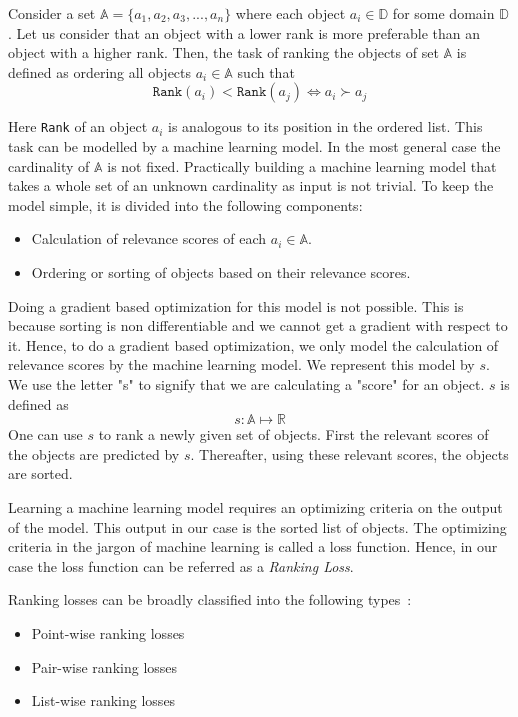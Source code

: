 \documentclass[12pt, twoside, ngerman]{report}
\begin{document}
Consider a set $\mathbb{A} = \{a_1,  a_2,  a_3, ... ,  a_n\}$ where each object $a_i \in \mathbb{D}$ for some domain $\mathbb{D}$.
Let us consider that an object with a lower rank is more preferable than an object with a higher rank.
Then,  the task of ranking the objects of set $\mathbb{A}$ is defined as ordering all objects $a_i \in \mathbb{A}$ such that
$$
\texttt{Rank}(a_i) < \texttt{Rank}(a_j) \iff a_i  \succ a_j
$$

Here \texttt{Rank} of an object $a_i$ is analogous to its position in the ordered list.
This task can be modelled by a machine learning model.
In the most general case the cardinality of $\mathbb{A}$ is not fixed.
Practically building a machine learning model that takes a whole set of an unknown cardinality as input is not trivial.
To keep the model simple,  it is divided into the following components:~\cite{procedureforrankinginintro}
\begin{itemize}
\item Calculation of relevance scores of each $a_i \in \mathbb{A}$.
\item Ordering or sorting of objects based on their relevance scores. 
\end{itemize}

Doing a gradient based optimization for this model is not possible.
This is because sorting is non differentiable and we cannot get a gradient with respect to it.
Hence, to do a gradient based optimization,  we only model the calculation of relevance scores by the machine learning model.
We represent this model by $s$.
We use the letter "s" to signify that we are calculating a "score" for an object. 
$s$ is defined as
$$
s : \mathbb{A} \mapsto \mathbb{R}
$$
One can use $s$ to rank a newly given set of objects.
First the relevant scores of the objects are predicted by $s$.
Thereafter,  using these relevant scores,  the objects are sorted.

Learning a machine learning model requires an optimizing criteria on the output of the model.
This output in our case is the sorted list of objects.
The optimizing criteria in the jargon of machine learning is called a loss function.
Hence,  in our case the loss function can be referred as a \textit{Ranking Loss}.

Ranking losses can be broadly classified into the following types~\cite{RankingLossFirstPaperRead}:
\begin{itemize}
\item  Point-wise ranking losses
\item  Pair-wise ranking losses
\item  List-wise ranking losses
\end{itemize}
\end{document}
